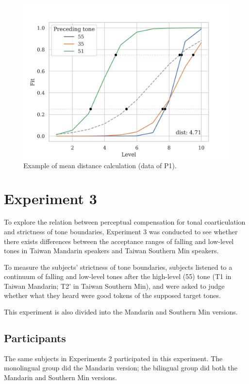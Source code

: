 \documentclass[12pt]{report}
\begin{document}
\begin{CJK}{UTF8}{bsmi}
\begin{figure}[h]
\centering
\includegraphics[scale=1]{Figures/E2/ProcessedExample.png}
\caption{Example of mean distance calculation (data of P1).}
\label{Figure:E2ProcessedExample}
\end{figure}

\section{Experiment 3}\label{section:Experiment3}
To explore the relation between perceptual compensation for tonal coarticulation and strictness of tone boundaries, Experiment 3 was conducted to see whether there exists differences between the acceptance ranges of falling and low-level tones in Taiwan Mandarin speakers and Taiwan Southern Min speakers.

To measure the subjects' strictness of tone boundaries, subjects listened to a continuum of falling and low-level tones after the high-level (55) tone (T1 in Taiwan Mandarin; T2' in Taiwan Southern Min), and were asked to judge whether what they heard were good tokens of the supposed target tones.

This experiment is also divided into the Mandarin and Southern Min versions.

\subsection{Participants}
The same subjects in Experiments 2 participated in this experiment. The monolingual group did the Mandarin version; the bilingual group did both the Mandarin and Southern Min versions.


\end{CJK}
\end{document}
